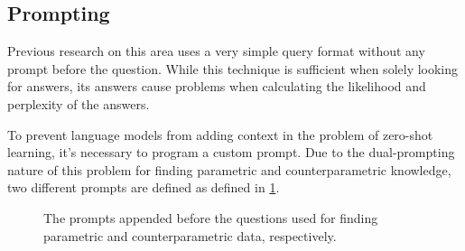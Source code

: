 \subsection{Prompting}

Previous research on this area uses a very simple query format without any prompt before the question\cite{how_can_we_know}\cite{factual_recall}.
While this technique is sufficient when solely looking for answers, its answers cause problems when calculating the likelihood and perplexity of the answers.

To prevent language models from adding context in the problem of zero-shot learning, it's necessary to program a custom prompt\cite{beyondfewshot}.
Due to the dual-prompting nature of this problem for finding parametric and counterparametric knowledge, two different prompts are defined as defined in \cref{prompts}.

\begin{figure}[h]
	 \hfill{}
	\caption{The prompts appended before the questions used for finding parametric and counterparametric data, respectively.}
	\label{prompts}
\end{figure}
